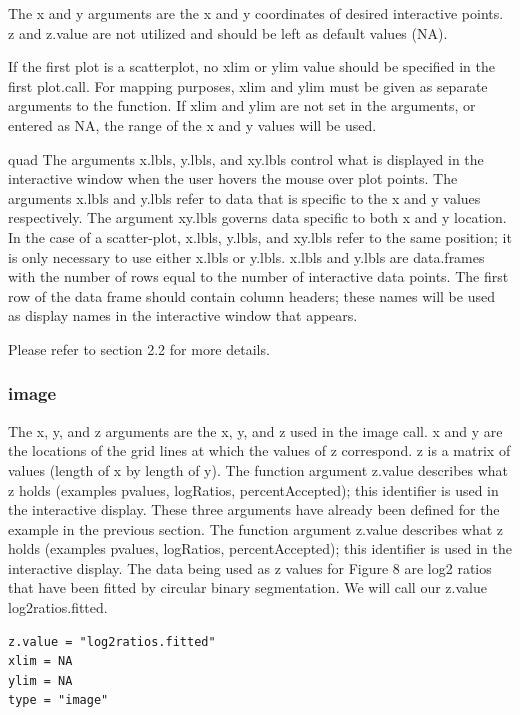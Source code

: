 \documentclass[]{article}
\begin{document}
\indent The x and y arguments are the x and y coordinates of desired interactive points. z and z.value are not utilized and should be left as default values (NA). 

\indent If the first plot is a scatterplot, no xlim or ylim value should be specified in the first plot.call. For mapping purposes, xlim and ylim must be given as separate arguments to the function. If xlim and ylim are not set in the arguments, or entered as NA, the range of the x and y values will be used.

quad The arguments x.lbls, y.lbls, and xy.lbls control what is displayed in the interactive window when the user hovers the mouse over plot points. The arguments x.lbls and y.lbls refer to data that is specific to the x and y values respectively. The argument xy.lbls governs data specific to both x and y location. In the case of a scatter-plot, x.lbls, y.lbls, and xy.lbls refer to the same position; it is only necessary to use either x.lbls or y.lbls. x.lbls and y.lbls are data.frames with the number of rows equal to the number of interactive data points. The first row of the data frame should contain column headers; these names will be used as display names in the interactive window that appears. \newline

 Please refer to section 2.2 for more details. 

\subsubsection{image}

\indent The x, y, and z arguments are the x, y, and z used in the image call. x and y are the locations of the grid lines at which the values of z correspond. z is a matrix of values (length of x  by length of y). The function argument z.value describes what z holds (examples pvalues, logRatios, percentAccepted); this identifier is used in the interactive display. These three arguments have already been defined for the example in the previous section. The function argument z.value describes what z holds (examples pvalues, logRatios, percentAccepted); this identifier is used in the interactive display. The data being used as z values for Figure 8 are log2 ratios that have been fitted by circular binary segmentation. We will call our z.value log2ratios.fitted.

\begin{verbatim}
z.value = "log2ratios.fitted"
xlim = NA
ylim = NA
type = "image" 
\end{verbatim}
\end{document}
